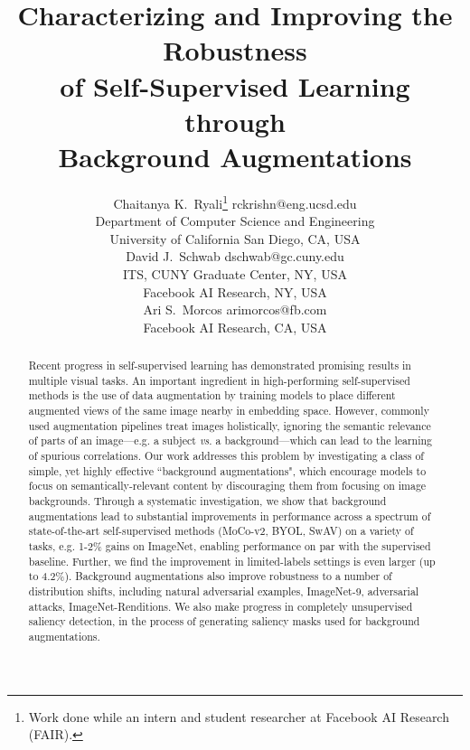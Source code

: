 \documentclass[twoside,11pt]{article}
\newcommand{\moco}{MoCo-v2}
\begin{document}
\title{Characterizing and Improving the Robustness \\ of Self-Supervised Learning through  \\ Background Augmentations}

\author{\name Chaitanya K.\ Ryali\thanks{Work done while an intern and student researcher at Facebook AI Research (FAIR).} \email rckrishn@eng.ucsd.edu \\
       \addr Department of Computer Science and Engineering\\
       University of California San Diego, CA, USA\\
       \AND
       \name David J.\ Schwab \email dschwab@gc.cuny.edu \\
       \addr ITS, CUNY Graduate Center, NY, USA\\ 
       Facebook AI Research, NY, USA\\
       \AND
       \name Ari S.\ Morcos \email arimorcos@fb.com \\
       \addr Facebook AI Research, CA, USA\\
       }

\editor{}

\maketitle


\begin{abstract}Recent progress in self-supervised learning has demonstrated promising results in multiple visual tasks. An important ingredient in high-performing self-supervised methods is the use of data augmentation by training models to place different augmented views of the same image nearby in embedding space. However, commonly used augmentation pipelines treat images holistically, ignoring the semantic relevance of parts of an image—e.g. a subject \textit{vs}. a background—which can lead to the learning of spurious correlations. Our work addresses this problem by investigating a class of simple, yet highly effective “background augmentations", which encourage models to focus on semantically-relevant content by discouraging them from focusing on image backgrounds. Through a systematic investigation, we show that background augmentations lead to substantial improvements in performance across a spectrum of state-of-the-art self-supervised methods (\moco, BYOL, SwAV) on a variety of tasks, e.g. 1-2\% gains on ImageNet, enabling performance on par with the supervised baseline. Further, we find the improvement in limited-labels settings is even larger (up to 4.2\%). Background augmentations also improve robustness to a number of distribution shifts, including natural adversarial examples, ImageNet-9, adversarial attacks, ImageNet-Renditions. We also make progress in completely unsupervised saliency detection, in the process of generating saliency masks used for background augmentations. 
\end{abstract}
\end{document}

